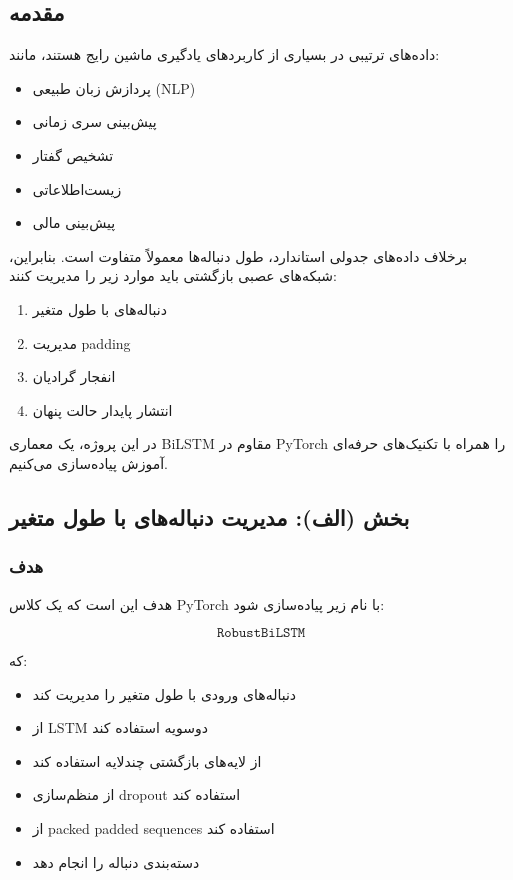 \documentclass[12pt,a4paper]{article}
\begin{document}
\newpage

\subsection{مقدمه}

داده‌های ترتیبی در بسیاری از کاربردهای یادگیری ماشین رایج هستند، مانند:

\begin{itemize}
	\item پردازش زبان طبیعی (NLP)
	\item پیش‌بینی سری زمانی
	\item تشخیص گفتار
	\item زیست‌اطلاعاتی
	\item پیش‌بینی مالی
\end{itemize}

برخلاف داده‌های جدولی استاندارد، طول دنباله‌ها معمولاً متفاوت است. بنابراین، شبکه‌های عصبی بازگشتی باید موارد زیر را مدیریت کنند:

\begin{enumerate}
	\item دنباله‌های با طول متغیر
	\item مدیریت padding
	\item انفجار گرادیان
	\item انتشار پایدار حالت پنهان
\end{enumerate}

در این پروژه، یک معماری BiLSTM مقاوم در PyTorch را همراه با تکنیک‌های حرفه‌ای آموزش پیاده‌سازی می‌کنیم.

\subsection{بخش (الف): مدیریت دنباله‌های با طول متغیر}

\subsubsection{هدف}

هدف این است که یک کلاس PyTorch با نام زیر پیاده‌سازی شود:

\[
\texttt{RobustBiLSTM}
\]

که:

\begin{itemize}
	\item دنباله‌های ورودی با طول متغیر را مدیریت کند
	\item از LSTM دو‌سویه استفاده کند
	\item از لایه‌های بازگشتی چند‌لایه استفاده کند
	\item از منظم‌سازی dropout استفاده کند
	\item از packed padded sequences استفاده کند
	\item دسته‌بندی دنباله را انجام دهد
\end{itemize}
\end{document}
